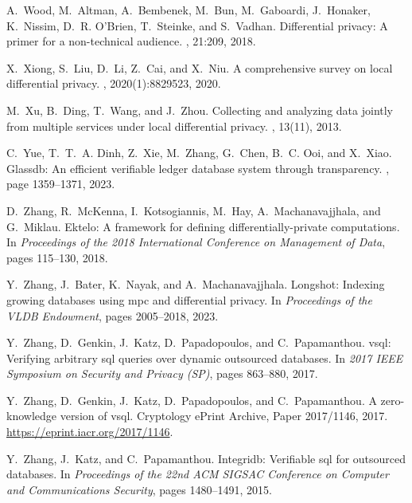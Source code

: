 \documentclass[11pt]{article}
\begin{document}
\begin{thebibliography}{140}
\begin{small}
A.~Wood, M.~Altman, A.~Bembenek, M.~Bun, M.~Gaboardi, J.~Honaker, K.~Nissim,
  D.~R. O'Brien, T.~Steinke, and S.~Vadhan.
\newblock Differential privacy: A primer for a non-technical audience.
, 21:209, 2018.

X.~Xiong, S.~Liu, D.~Li, Z.~Cai, and X.~Niu.
\newblock A comprehensive survey on local differential privacy.
, 2020(1):8829523, 2020.

M.~Xu, B.~Ding, T.~Wang, and J.~Zhou.
\newblock Collecting and analyzing data jointly from multiple services under
  local differential privacy.
, 13(11), 2013.

C.~Yue, T.~T.~A. Dinh, Z.~Xie, M.~Zhang, G.~Chen, B.~C. Ooi, and X.~Xiao.
\newblock Glassdb: An efficient verifiable ledger database system through
  transparency.
, page 1359–1371, 2023.

D.~Zhang, R.~McKenna, I.~Kotsogiannis, M.~Hay, A.~Machanavajjhala, and
  G.~Miklau.
\newblock Ektelo: A framework for defining differentially-private computations.
\newblock In {\em Proceedings of the 2018 International Conference on
  Management of Data}, pages 115--130, 2018.

Y.~Zhang, J.~Bater, K.~Nayak, and A.~Machanavajjhala.
\newblock Longshot: Indexing growing databases using mpc and differential
  privacy.
\newblock In {\em Proceedings of the VLDB Endowment}, pages 2005--2018, 2023.

Y.~Zhang, D.~Genkin, J.~Katz, D.~Papadopoulos, and C.~Papamanthou.
\newblock vsql: Verifying arbitrary sql queries over dynamic outsourced
  databases.
\newblock In {\em 2017 IEEE Symposium on Security and Privacy (SP)}, pages
  863--880, 2017.

Y.~Zhang, D.~Genkin, J.~Katz, D.~Papadopoulos, and C.~Papamanthou.
\newblock A zero-knowledge version of vsql.
\newblock Cryptology ePrint Archive, Paper 2017/1146, 2017.
\newblock \url{https://eprint.iacr.org/2017/1146}.

Y.~Zhang, J.~Katz, and C.~Papamanthou.
\newblock Integridb: Verifiable sql for outsourced databases.
\newblock In {\em Proceedings of the 22nd ACM SIGSAC Conference on Computer and
  Communications Security}, pages 1480--1491, 2015.


\end{small}
\end{thebibliography}
\end{document}
